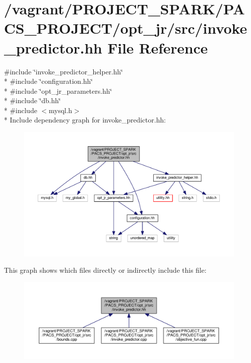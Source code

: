\hypertarget{invoke__predictor_8hh}{\section{/vagrant/\-P\-R\-O\-J\-E\-C\-T\-\_\-\-S\-P\-A\-R\-K/\-P\-A\-C\-S\-\_\-\-P\-R\-O\-J\-E\-C\-T/opt\-\_\-jr/src/invoke\-\_\-predictor.hh File Reference}
\label{invoke__predictor_8hh}
}
{\ttfamily \#include \char`\"{}invoke\-\_\-predictor\-\_\-helper.\-hh\char`\"{}}\\*
{\ttfamily \#include \char`\"{}configuration.\-hh\char`\"{}}\\*
{\ttfamily \#include \char`\"{}opt\-\_\-jr\-\_\-parameters.\-hh\char`\"{}}\\*
{\ttfamily \#include \char`\"{}db.\-hh\char`\"{}}\\*
{\ttfamily \#include $<$mysql.\-h$>$}\\*
Include dependency graph for invoke\-\_\-predictor.\-hh\-:
\nopagebreak
\begin{figure}[H]
\begin{center}
\leavevmode
\includegraphics[width=350pt]{invoke__predictor_8hh__incl}
\end{center}
\end{figure}
This graph shows which files directly or indirectly include this file\-:
\nopagebreak
\begin{figure}[H]
\begin{center}
\leavevmode
\includegraphics[width=350pt]{invoke__predictor_8hh__dep__incl}
\end{center}
\end{figure}
